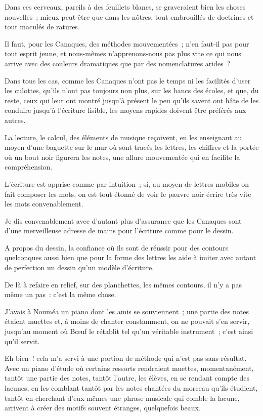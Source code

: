 \documentclass[french,twoside]{book} %
\begin{document}
Dans ces cerveaux, pareils à des feuillets blancs, se graveraient bien les choses nouvelles ; mieux peut-être que dans les nôtres, tout embrouillés de doctrines et tout maculés de ratures.\par
Il faut, pour les Canaques, des méthodes mouvementées ; n’en faut-il pas pour tout esprit jeune, et nous-mêmes n’apprenons-nous pas plus vite ce qui nous arrive avec des couleurs dramatiques que par des nomenclatures arides ?\par
Dans tous les cas, comme les Canaques n’ont pas le temps ni les facilités d’user les culottes, qu’ils n’ont pas toujours non plus, sur les bancs des écoles, et que, du reste, ceux qui leur ont montré jusqu’à présent le peu qu’ils savent ont hâte de les conduire jusqu’à l’écriture lisible, les moyens rapides doivent être préférés aux autres.\par
La lecture, le calcul, des éléments de musique reçoivent, en les enseignant au moyen d’une baguette sur le mur où sont tracés les lettres, les chiffres et la portée où un bout noir figurera les notes, une allure mouvementée qui en facilite la compréhension.\par
 L’écriture est apprise comme par intuition ; si, au moyen de lettres mobiles on fait composer les mots, on est tout étonné de voir le pauvre noir écrire très vite les mots convenablement.\par
Je dis convenablement avec d’autant plus d’assurance que les Canaques sont d’une merveilleuse adresse de mains pour l’écriture comme pour le dessin.\par
A propos du dessin, la confiance où ils sont de réussir pour des contours quelconques aussi bien que pour la forme des lettres les aide à imiter avec autant de perfection un dessin qu’un modèle d’écriture.\par
De là à refaire en relief, sur des planchettes, les mêmes contours, il n’y a pas même un pas : c’est la même chose.\par
J’avais à Nouméa un piano dont les amis se souviennent ; une partie des notes étaient muettes et, à moins de chanter constamment, on ne pouvait s’en servir, jusqu’au moment où Bœuf le rétablit tel qu’un véritable instrument ; c’est ainsi qu’il servit.\par
Eh bien ! cela m’a servi à une portion de méthode qui n’est pas sans résultat. Avec un piano d’étude où certains ressorts rendraient muettes, momentanément, tantôt une partie des notes, tantôt l’autre, les élèves, en se rendant  compte des lacunes, en les comblant tantôt par les notes chantées du morceau qu’ils étudient, tantôt en cherchant d’eux-mêmes une phrase musicale qui comble la lacune, arrivent à créer des motifs souvent étranges, quelquefois beaux.\par
\end{document}
